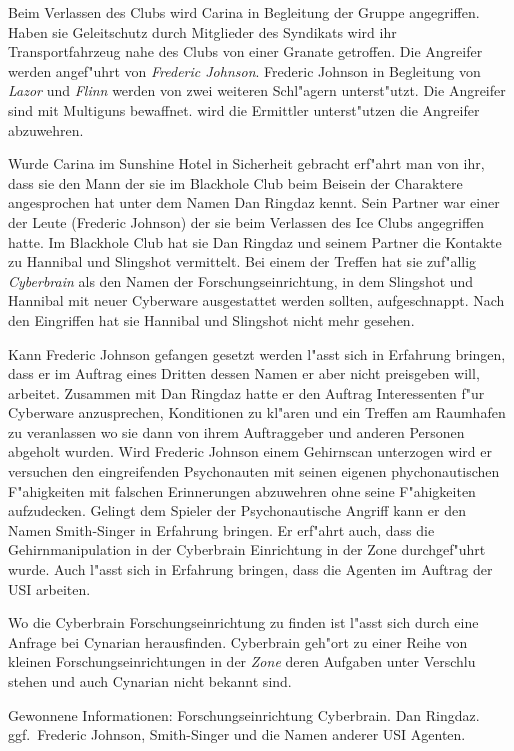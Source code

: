 Beim Verlassen des Clubs wird Carina in Begleitung der Gruppe angegriffen. Haben sie Geleitschutz durch Mitglieder des Syndikats wird ihr Transportfahrzeug nahe des Clubs von einer Granate getroffen. Die Angreifer werden angef"uhrt von \emph{Frederic Johnson}. Frederic Johnson in Begleitung von \emph{Lazor} und \emph{Flinn} werden von zwei weiteren Schl"agern unterst"utzt. Die Angreifer sind mit Multiguns bewaffnet. \xl{} wird die Ermittler unterst"utzen die Angreifer abzuwehren.

Wurde Carina im Sunshine Hotel in Sicherheit gebracht erf"ahrt man von ihr, dass sie den Mann der sie im Blackhole Club beim Beisein der Charaktere angesprochen hat unter dem Namen Dan Ringdaz kennt. Sein Partner war einer der Leute (Frederic Johnson) der sie beim Verlassen des Ice Clubs angegriffen hatte. Im Blackhole Club hat sie Dan Ringdaz und seinem Partner die Kontakte zu Hannibal und Slingshot vermittelt. Bei einem der Treffen hat sie zuf"allig \emph{Cyberbrain} als den Namen der Forschungseinrichtung, in dem Slingshot und Hannibal mit neuer Cyberware ausgestattet werden sollten, aufgeschnappt. Nach den Eingriffen hat sie Hannibal und Slingshot nicht mehr gesehen.

Kann Frederic Johnson gefangen gesetzt werden l"asst sich in Erfahrung bringen, dass er im Auftrag eines Dritten dessen Namen er aber nicht preisgeben will, arbeitet. Zusammen mit Dan Ringdaz hatte er den Auftrag Interessenten f"ur Cyberware anzusprechen, Konditionen zu kl"aren und ein Treffen am Raumhafen zu veranlassen wo sie dann von ihrem Auftraggeber und anderen Personen abgeholt wurden. Wird Frederic Johnson einem Gehirnscan unterzogen wird er versuchen den eingreifenden Psychonauten mit seinen eigenen phychonautischen F"ahigkeiten mit falschen Erinnerungen abzuwehren ohne seine F"ahigkeiten aufzudecken. Gelingt dem Spieler der Psychonautische Angriff kann er den Namen Smith-Singer in Erfahrung bringen. Er erf"ahrt auch, dass die Gehirnmanipulation in der Cyberbrain Einrichtung in der Zone durchgef"uhrt wurde. Auch l"asst sich in Erfahrung bringen, dass die Agenten im Auftrag der USI arbeiten.

Wo die Cyberbrain Forschungseinrichtung zu finden ist l"asst sich durch eine Anfrage bei Cynarian herausfinden. Cyberbrain geh"ort zu einer Reihe von kleinen Forschungseinrichtungen in der \emph{Zone} deren Aufgaben unter Verschlu\3 stehen und auch Cynarian nicht bekannt sind.

\begin{remarks}
	Gewonnene Informationen: Forschungseinrichtung Cyberbrain. Dan Ringdaz. ggf.~Frederic Johnson, Smith-Singer und die Namen anderer USI Agenten.
\end{remarks}
